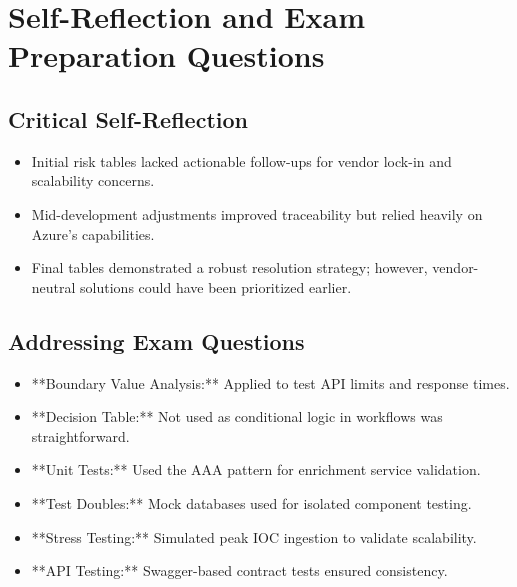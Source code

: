 \documentclass[12pt]{article}
\begin{document}
\newpage

\section{Self-Reflection and Exam Preparation Questions}
\subsection{Critical Self-Reflection}
\begin{itemize}
    \item Initial risk tables lacked actionable follow-ups for vendor lock-in and scalability concerns.
    \item Mid-development adjustments improved traceability but relied heavily on Azure's capabilities.
    \item Final tables demonstrated a robust resolution strategy; however, vendor-neutral solutions could have been prioritized earlier.
\end{itemize}

\subsection{Addressing Exam Questions}
\begin{itemize}
    \item **Boundary Value Analysis:** Applied to test API limits and response times.
    \item **Decision Table:** Not used as conditional logic in workflows was straightforward.
    \item **Unit Tests:** Used the AAA pattern for enrichment service validation.
    \item **Test Doubles:** Mock databases used for isolated component testing.
    \item **Stress Testing:** Simulated peak IOC ingestion to validate scalability.
    \item **API Testing:** Swagger-based contract tests ensured consistency.
\end{itemize}
\end{document}

